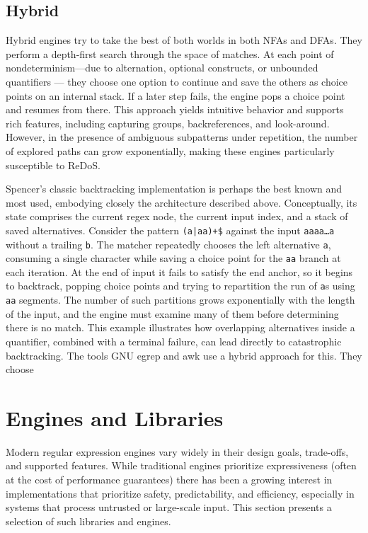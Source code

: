 \subsection{Hybrid}
Hybrid engines try to take the best of both worlds in both NFAs and DFAs. They perform a depth-first search through the space of matches. At each point of nondeterminism—due to alternation, optional constructs, or unbounded quantifiers — they choose one option to continue and save the others as choice points on an internal stack. If a later step fails, the engine pops a choice point and resumes from there. This approach yields intuitive behavior and supports rich features, including capturing groups, backreferences, and look-around. However, in the presence of ambiguous subpatterns under repetition, the number of explored paths can grow exponentially, making these engines particularly susceptible to ReDoS.

Spencer’s classic backtracking implementation is perhaps the best known and most used, embodying closely the architecture described above. Conceptually, its state comprises the current regex node, the current input index, and a stack of saved alternatives. Consider the pattern \texttt{(a|aa)+\$} against the input \texttt{aaaa\ldots a} without a trailing \texttt{b}. The matcher repeatedly chooses the left alternative \texttt{a}, consuming a single character while saving a choice point for the \texttt{aa} branch at each iteration. At the end of input it fails to satisfy the end anchor, so it begins to backtrack, popping choice points and trying to repartition the run of \texttt{a}s using \texttt{aa} segments. The number of such partitions grows exponentially with the length of the input, and the engine must examine many of them before determining there is no match. This example illustrates how overlapping alternatives inside a quantifier, combined with a terminal failure, can lead directly to catastrophic backtracking.
The tools GNU egrep and awk use a hybrid approach for this. They choose

\section{Engines and Libraries}
Modern regular expression engines vary widely in their design goals, trade-offs, and supported features. While traditional engines prioritize expressiveness (often at the cost of performance guarantees) there has been a growing interest in implementations that prioritize safety, predictability, and efficiency, especially in systems that process untrusted or large-scale input. This section presents a selection of such libraries and engines.


